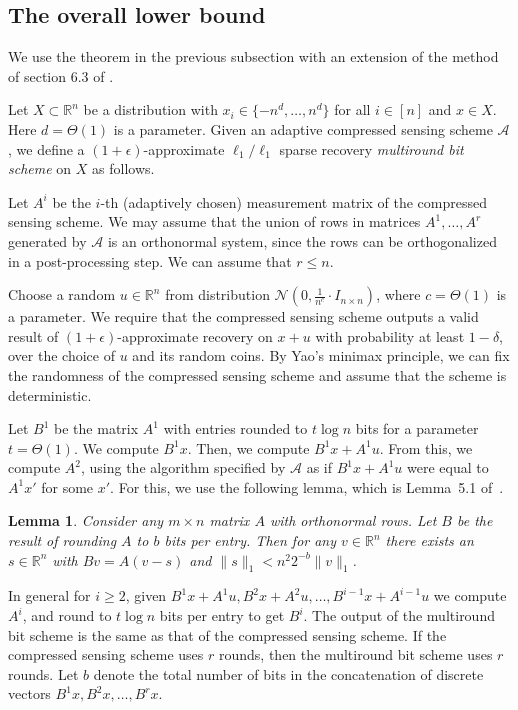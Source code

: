 \documentclass[twoside,leqno,twocolumn]{article}
\newtheorem{lemma}[theorem]{Lemma}
\def\R{\mathbb{R}}
\def\eps{\epsilon}
\begin{document}
\subsection{The overall lower bound}\label{sec:cc2}
We use the theorem in the previous subsection with an extension of the method of section 6.3
of \cite{PW11}. 

  Let $X \subset \R^n$ be a distribution with $x_i \in \{-n^d, \dotsc,
  n^d\}$ for all $i \in [n]$ and $x \in X$.  Here $d = \Theta(1)$ is a parameter. 
Given an adaptive compressed 
  sensing scheme $\mathcal{A}$, we define a
  $(1+\eps)$-approximate $\ell_1/\ell_1$ sparse recovery
  {\it multiround bit scheme} on $X$ as follows. 

Let $A^i$ be the $i$-th (adaptively chosen) measurement matrix of the compressed sensing scheme. 
We may assume that the union of rows in matrices $A^1, \ldots, A^r$ generated by $\mathcal{A}$
is an orthonormal system, since the rows can be orthogonalized in a post-processing step. 
We can assume that $r \leq n$. 

  Choose a random $u \in \mathbb{R}^n$ 
from distribution $\mathcal{N}(0, \frac{1}{n^c} \cdot I_{n \times n})$,
  where $c = \Theta(1)$ is a parameter.  
  We require that the compressed sensing scheme outputs a valid result of 
  $(1+\eps)$-approximate recovery on $x+u$ with probability at least $1-\delta$, 
  over the choice of $u$ and its random coins. By Yao's minimax principle, we can fix the 
  randomness of the compressed sensing scheme and
  assume that the scheme is deterministic. 

Let $B^{1}$ be the matrix
  $A^1$ with entries rounded to $t \log n$ bits for a parameter $t = \Theta(1)$. 
  We compute $B^1x$. Then, we compute 
  $B^1x + A^1u$. From this, we compute $A^2$, 
   using the algorithm specified by $\mathcal{A}$ as if $B^1x + A^1u$ were equal to 
   $A^1x'$ for some $x'$. For this, we use the following lemma, which is Lemma~5.1 of~\cite{DIPW}.
\begin{lemma}\label{lem:roundingFix}
Consider any $m \times n$ matrix $A$ with orthonormal rows. Let $B$ be the result
of rounding $A$ to $b$ bits per entry. Then for any $v \in \mathbb{R}^n$ there
exists an $s \in \mathbb{R}^n$ with $Bv = A(v-s)$ and $\|s\|_1 < n^2 2^{-b} \|v\|_1$.
\end{lemma}

  In general for $i \geq 2$, given $B^1x + A^1u, B^2x + A^2u, \ldots, B^{i-1}x + A^{i-1}u$ we 
  compute $A^i$, and round to $t\log n$
  bits per entry to get $B^i$.
  The output of the multiround bit scheme is the same as that of 
  the compressed sensing scheme. If the compressed sensing scheme uses $r$ rounds, then the multiround
  bit scheme uses $r$ rounds. Let $b$ denote the total number of bits in the concatenation of discrete
  vectors $B^1x, B^2x, \ldots, B^rx$. 
\end{document}
